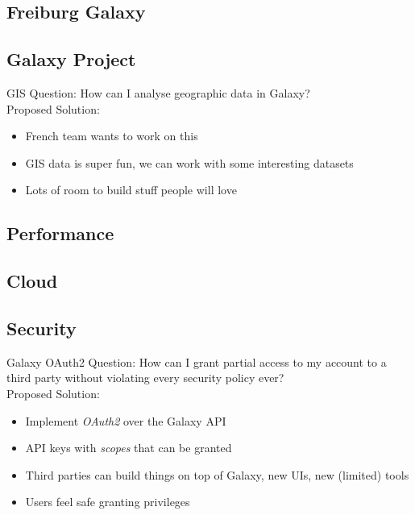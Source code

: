 \documentclass[12pt]{ufrslides}
\begin{document}
\subsection{Freiburg Galaxy}

\subsection{Galaxy Project}

	\begin{frame}{GIS}
		Question: How can I analyse geographic data in Galaxy? \\[0.6cm]
		Proposed Solution:
		\begin{itemize}
			\item French team wants to work on this
			\item GIS data is super fun, we can work with some interesting datasets
			\item Lots of room to build stuff people will love
		\end{itemize}
	\end{frame}

\subsection{Performance}

\subsection{Cloud}

\subsection{Security}

	\begin{frame}{Galaxy OAuth2}
		Question: How can I grant partial access to my account to a third party without violating every security policy ever? \\[0.6cm]
		Proposed Solution:
		\begin{itemize}
			\item Implement \emph{OAuth2} over the Galaxy API
			\item API keys with \emph{scopes} that can be granted
			\item Third parties can build things on top of Galaxy, new UIs, new (limited) tools
			\item Users feel safe granting privileges
		\end{itemize}
	\end{frame}
\end{document}
